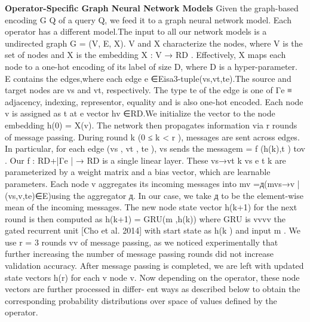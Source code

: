 \documentclass{article}
\begin{document}
\textbf{Operator-Specific Graph Neural Network Models} Given the graph-based encoding G Q of a query Q, we feed it to a graph neural network model. Each operator has a different model.The input to all our network models is a undirected graph G = (V, E, X). V and X characterize the nodes, where V is the set of nodes and X is the embedding X : V → RD . Effectively, X maps each node to a one-hot encoding of its label of size D, where D is a hyper-parameter. E contains the edges,where each edge e ∈Eisa3-tuple(vs,vt,te).The source and target nodes are vs and vt, respectively. The type te of the edge is one of Γe ≡ {adjacency, indexing, representor, equality} and is also one-hot encoded.
Each node v is assigned as t at e vector hv ∈RD.We initialize the vector to the node embedding h(0) = X(v). The network then propagates information via r rounds of message passing. During round k (0 ≤ k < r ), messages are sent across edges. In particular, for each edge (vs , vt , te ), vs sends the messagem = f (h(k),t ) tov . Our f : RD+|Γe | → RD is a single linear layer. These
vs→vt k vs e t k
are parameterized by a weight matrix and a bias vector, which are learnable parameters. Each node
v aggregates its incoming messages into mv =д({mvs→v |(vs,v,te)∈E})using the aggregator
д. In our case, we take д to be the element-wise mean of the incoming messages. The new node
state vector h(k+1) for the next round is then computed as h(k+1) = GRU(m ,h(k)) where GRU is vvvv
the gated recurrent unit [Cho et al. 2014] with start state as h(k ) and input m . We use r = 3 rounds vv
of message passing, as we noticed experimentally that further increasing the number of message passing rounds did not increase validation accuracy.
After message passing is completed, we are left with updated state vectors h(r) for each v
node v. Now depending on the operator, these node vectors are further processed in differ- ent ways as described below to obtain the corresponding probability distributions over space of values defined by the operator.
\end{document}
